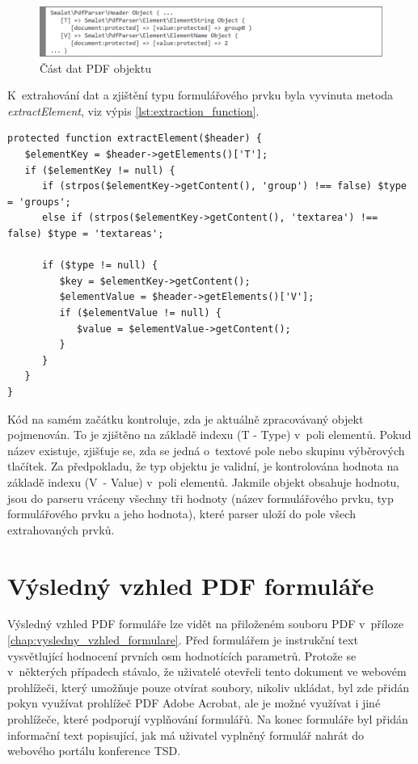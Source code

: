 \begin{figure}[h!]
\centering
\includegraphics[width=15cm]{img/parsing_object}
\caption{Část dat PDF objektu}
\label{fig:parsing_object}
\end{figure}
\par
K~extrahování dat a zjištění typu formulářového prvku byla vyvinuta metoda \textit{extractElement}, viz výpis \ref{lst:extraction_function}.
\begin{lstlisting}[caption = {Funkční kód pro uložení formulářových prvků z~PDF objektů}, label = {lst:extraction_function}, captionpos=b]
protected function extractElement($header) {
   $elementKey = $header->getElements()['T'];                                                      
   if ($elementKey != null) {
      if (strpos($elementKey->getContent(), 'group') !== false) $type = 'groups';
      else if (strpos($elementKey->getContent(), 'textarea') !== false) $type = 'textareas';
                       
      if ($type != null) {
         $key = $elementKey->getContent();
         $elementValue = $header->getElements()['V'];
         if ($elementValue != null) {
            $value = $elementValue->getContent();
         }    
      }
   }
}
\end{lstlisting}
Kód na samém začátku kontroluje, zda je aktuálně zpracovávaný objekt pojmenován. To je zjištěno na základě indexu  (T - Type) v~poli elementů. Pokud název existuje, zjišťuje se, zda se jedná o~textové pole nebo skupinu výběrových tlačítek. Za předpokladu, že typ objektu je validní, je kontrolována hodnota na základě indexu  (V~- Value) v~poli elementů. Jakmile objekt obsahuje hodnotu, jsou do parseru vráceny všechny tři hodnoty (název formulářového prvku, typ formulářového prvku a jeho hodnota), které parser uloží do pole všech extrahovaných prvků.

\section{Výsledný vzhled PDF formuláře}
Výsledný vzhled PDF formuláře lze vidět na přiloženém souboru PDF v~příloze \ref{chap:vysledny_vzhled_formulare}. Před formulářem je instrukční text vysvětlující hodnocení prvních osm hodnotících parametrů. Protože se v~některých případech stávalo, že uživatelé otevřeli tento dokument ve webovém prohlížeči, který umožňuje pouze otvírat soubory, nikoliv ukládat, byl zde přidán pokyn využívat prohlížeč PDF Adobe Acrobat, ale je možné využívat i jiné prohlížeče, které podporují vyplňování formulářů. Na konec formuláře byl přidán informační text popisující, jak má uživatel vyplněný formulář nahrát do webového portálu konference TSD.

